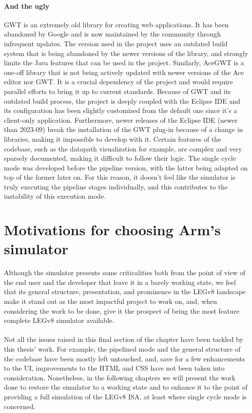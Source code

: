 \paragraph{And the ugly}
GWT is an extremely old library for creating web applications. It has been abandoned by Google and is now maintained by the community through infrequent updates. The version used in the project uses an outdated build system that is being abandoned by the newer versions of the library, and strongly limits the Java features that can be used in the project. Similarly, AceGWT is a one-off library that is not being actively updated with newer versions of the Ace editor nor GWT. It is a crucial dependency of the project and would require parallel efforts to bring it up to current standards. Because of GWT and its outdated build process, the project is deeply coupled with the Eclipse IDE and its configuration has been slightly customized from the default one since it's a client-only application. Furthermore, newer releases of the Eclipse IDE (newer than 2023-09) break the installation of the GWT plug-in because of a change in libraries, making it impossible to develop with it. Certain features of the codebase, such as the datapath visualization for example, are complex and very sparsely documented, making it difficult to follow their logic. The single cycle mode was developed before the pipeline version, with the latter being adapted on top of the former later on. For this reason, it doesn't feel like the simulator is truly executing the pipeline stages individually, and this contributes to the instability of this execution mode.
\section{Motivations for choosing Arm's simulator}
\paragraph{}
Although the simulator presents some criticalities both from the point of view of the end user and the developer that leave it in a barely working state, we feel that its general structure, presentation, and prominence in the LEGv8 landscape make it stand out as the most impactful project to work on, and, when considering the work to be done, give it the prospect of being the most feature complete LEGv8 simulator available.
\paragraph{}
Not all the issues raised in this final section of the chapter have been tackled by this thesis' work. For example, the pipelined mode and the general structure of the codebase have been mostly left untouched, and, save for a few enhancements to the UI, improvements to the HTML and CSS have not been taken into consideration. Nonetheless, in the following chapters we will present the work done to restore the simulator to a working state and to enhance it to the point of providing a full simulation of the LEGv8 ISA, at least where single cycle mode is concerned.